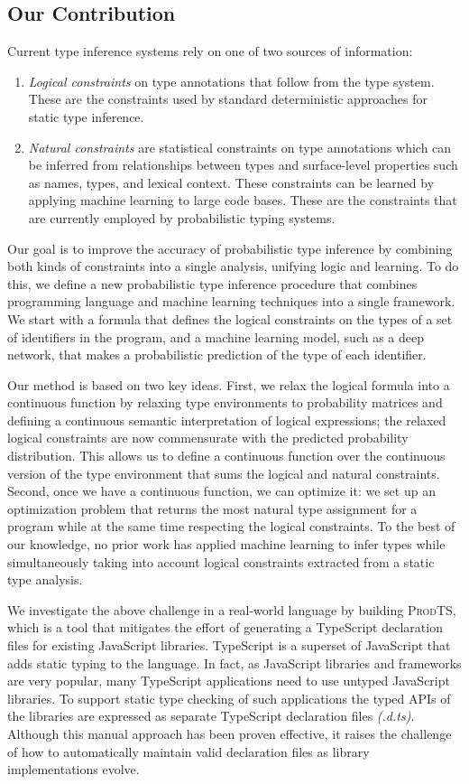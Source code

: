 \documentclass[sigplan,10pt,review,anonymous]{acmart}
\newcommand{\prodts}{\textsc{ProdTS}\xspace}
\theoremstyle{plain}
\theoremstyle{remark}
\theoremstyle{definition}
\begin{document}
\subsection{Our Contribution}
Current type inference systems rely
on one of two sources of information:
\begin{enumerate}[label=(\Roman*)]
  \item \emph{Logical constraints} on type annotations that follow from the type system. These are the  constraints used by standard deterministic approaches for static type inference.
  \item \emph{Natural constraints} are statistical constraints on type annotations
  which can be inferred from relationships between types and surface-level properties such as names, types, and lexical context. 
  These constraints can be learned by applying machine learning to large code bases.
  These are the constraints that are currently employed by probabilistic typing systems.
\end{enumerate}
Our goal is to improve the accuracy of probabilistic type
inference by combining both kinds of constraints into a single analysis, unifying logic and learning.
To do this, we define a new probabilistic type inference procedure that combines 
programming language and machine learning techniques into a single framework.
We start with a formula that defines the logical constraints on the types of a set of identifiers in the program,
and a machine learning model, such as a deep network, that makes a probabilistic prediction
of the type of each identifier.

Our method is based on two key ideas.
First, we relax the logical formula into a continuous function by relaxing type environments
to probability matrices and defining 
a continuous semantic interpretation of logical expressions; the relaxed logical constraints
are now commensurate with the predicted probability distribution.
This allows us to define a continuous function over the continuous version of the type environment
that sums the logical and natural constraints.
Second, once we have a continuous function, we can optimize it:
we set up an optimization problem that returns the most natural type assignment for a
program while at the same time respecting the logical constraints.
To the best of our knowledge, no prior work has applied machine learning to infer types while simultaneously taking into account logical constraints extracted from a static type analysis.

We investigate the above challenge in a real-world language by building \prodts, 
which is a tool that mitigates the effort of generating a
TypeScript declaration files for existing JavaScript libraries. TypeScript is a superset
of JavaScript that adds static typing to the language.
In fact, as JavaScript libraries and frameworks are very popular, many
TypeScript applications need to use untyped JavaScript libraries.
To support static type
checking of such applications the typed
APIs of the libraries are expressed as separate TypeScript
declaration files \emph{(.d.ts)}.  Although this manual approach has been proven
effective, it raises the challenge of how to automatically maintain valid declaration files as library implementations evolve.
\end{document}
